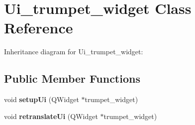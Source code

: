 \hypertarget{classUi__trumpet__widget}{}\section{Ui\+\_\+trumpet\+\_\+widget Class Reference}
\label{classUi__trumpet__widget}


Inheritance diagram for Ui\+\_\+trumpet\+\_\+widget\+:
\subsection*{Public Member Functions}
\begin{DoxyCompactItemize}
\item 
\mbox{\label{classUi__trumpet__widget_a437bd143c9ec2cf45b9baf2bb8975d52}} 
void {\bfseries setup\+Ui} (Q\+Widget $\ast$trumpet\+\_\+widget)
\item 
\mbox{\label{classUi__trumpet__widget_a37f5da6d55b93f90d1a9032ec95b719e}} 
void {\bfseries retranslate\+Ui} (Q\+Widget $\ast$trumpet\+\_\+widget)
\end{DoxyCompactItemize}
